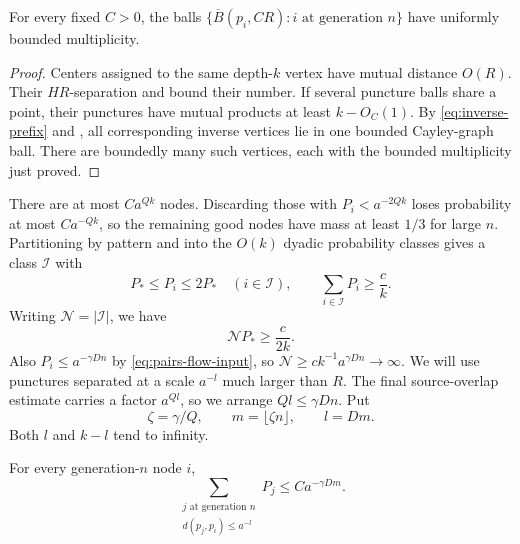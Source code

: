 \begin{lemma}
\label{lem:puncture-multiplicity}
For every fixed $C>0$, the balls
$\{\overline B(p_i,CR):i\text{ at generation }n\}$ have uniformly
bounded multiplicity.
\end{lemma}

\begin{proof}
Centers assigned to the same depth-$k$ vertex have mutual distance
$O(R)$. Their $HR$-separation and  bound their number.
If several puncture balls share a point, their punctures have mutual
products at least $k-O_C(1)$. By \eqref{eq:inverse-prefix} and
, all corresponding inverse vertices lie in one
bounded Cayley-graph ball. There are boundedly many such vertices,
each with the bounded multiplicity just proved.
\end{proof}

There are at most $Ca^{Qk}$ nodes. Discarding those with
$P_i<a^{-2Qk}$ loses probability at most $Ca^{-Qk}$, so the remaining
good nodes have mass at least $1/3$ for large $n$. Partitioning by
pattern and into the $O(k)$ dyadic probability classes gives a class
$\mathcal I$ with
\begin{equation}
 P_*\le P_i\le2P_*\quad(i\in\mathcal I),
 \qquad \sum_{i\in\mathcal I}P_i\ge\frac c k.
 \label{eq:pairs-class}
\end{equation}
Writing $\mathcal N=|\mathcal I|$, we have
\begin{equation}
 \mathcal NP_*\ge\frac{c}{2k}.
 \label{eq:pairs-class-size}
\end{equation}
Also $P_i\le a^{-\gamma Dn}$ by \eqref{eq:pairs-flow-input}, so
$\mathcal N\ge ck^{-1}a^{\gamma Dn}\to\infty$.
We will use punctures separated at a scale $a^{-l}$ much larger than
$R$. The final source-overlap estimate carries a factor $a^{Ql}$,
so we arrange $Ql\leq\gamma Dn$. Put
\[
 \zeta=\gamma/Q,\qquad m=\lfloor\zeta n\rfloor,\qquad l=Dm.
\]
Both $l$ and $k-l$ tend to infinity.

\begin{lemma}
\label{lem:near-puncture-probability}
For every generation-$n$ node $i$,
\begin{equation}
 \sum_{\substack{j\text{ at generation }n\\d(p_j,p_i)\le a^{-l}}}P_j
 \le Ca^{-\gamma Dm}.
 \label{eq:near-puncture-probability}
\end{equation}
\end{lemma}

